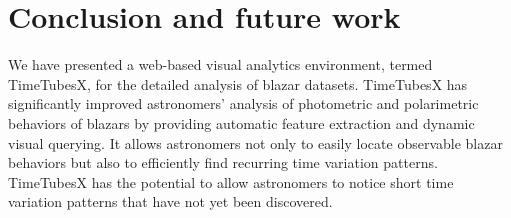 \section{Conclusion and future work\label{sec:conclusion}}
We have presented a web-based visual analytics environment, termed TimeTubesX, for the detailed analysis of blazar datasets. %
TimeTubesX has significantly improved astronomers' analysis of 
photometric and polarimetric behaviors of blazars
by providing automatic feature extraction and dynamic visual querying.
It allows astronomers not only to easily locate observable blazar behaviors but also to efficiently find recurring time variation patterns.
TimeTubesX has the potential to allow astronomers to notice short time variation patterns that have not yet been discovered.


